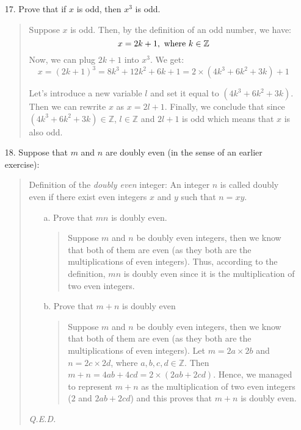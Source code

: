 \documentclass[12pt, a4paper]{article}                      %
\begin{document}
\begin{enumerate}
\item[17.]
Prove that if $x$ is odd, then $x^3$ is odd.

\begin{quote}
Suppose $x$ is odd. Then, by the definition of an odd number, we have:
$$x = 2k + 1, \ \textnormal{where} \ k \in \mathbb{Z}$$
Now, we can plug $2k + 1$ into $x^3$. We get:
$$
x = (2k + 1)^3 = 8k^3 + 12k^2 + 6k + 1 = 2 \times (4k^3 + 6k^2 + 3k) + 1
$$

Let's introduce a new variable $l$ and set it equal to $(4k^3 + 6k^2 + 3k)$.
Then we can rewrite $x$ as $x = 2l + 1$. Finally, we conclude that since
$(4k^3 + 6k^2 + 3k) \in \mathbb{Z}$, $l \in \mathbb{Z}$ and $2l + 1$ is odd which
means that $x$ is also odd.
\end{quote}

\item[18.]
Suppose that $m$ and $n$ are doubly even (in the sense of an earlier exercise):
\begin{quote}
Definition of the \textit{doubly even} integer: An integer $n$ is called doubly even if there exist even integers $x$ and $y$ such that $n = xy$.\\

\begin{itemize}
\item[a.]
Prove that $mn$ is doubly even.
\begin{quote}
Suppose $m$ and $n$ be doubly even integers, then we know that both of them are even (as they both are the multiplications of even integers).
Thus, according to the definition, $mn$ is doubly even since it is the multiplication of two even integers.
\end{quote}

\item[b.]
Prove that $m + n$ is doubly even
\begin{quote}
Suppose $m$ and $n$ be doubly even integers, then we know that both of them are even (as they both are the multiplications of even integers).
Let $m = 2a \times 2b$ and $n = 2c \times 2d$, where $a,b,c,d \in \mathbb{Z}$. Then $m + n = 4ab + 4cd = 2 \times (2ab + 2cd)$. Hence, we managed to represent
$m + n$ as the multiplication of two even integers ($2$ and $2ab + 2cd$) and this proves that $m + n$ is doubly even.
\end{quote}
\end{itemize}
\begin{flushright}
\textit{Q.E.D.}
\end{flushright}
\end{quote}


\end{enumerate}
\end{document}
